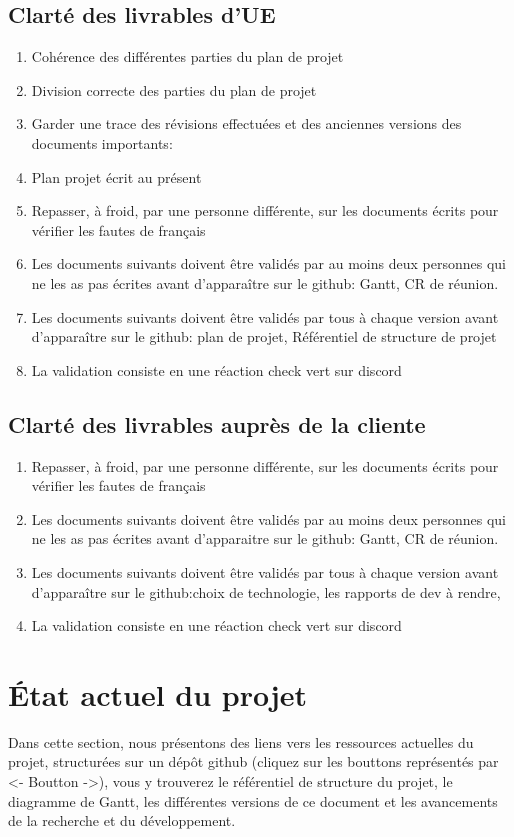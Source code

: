 \documentclass[11pt]{rapport_class}
\begin{document}
\section{Clarté des livrables d'UE}
\begin{enumerate}
    \item Cohérence des différentes parties du plan de projet
    \item Division correcte des parties du plan de projet
    \item Garder une trace des révisions effectuées et des anciennes versions des documents importants: 
    \item Plan projet écrit au présent
    \item Repasser, à froid, par une personne différente, sur les documents écrits pour vérifier les fautes de français
    \item Les documents suivants doivent être validés par au moins deux personnes qui ne les as pas écrites avant d'apparaître sur le github: Gantt, CR de réunion.
    \item Les documents suivants doivent être validés par tous à chaque version avant d'apparaître sur le github: plan de projet, Référentiel de structure de projet
    \item La validation consiste en une réaction check vert sur discord
\end{enumerate}
\section{Clarté des livrables auprès de la cliente}
\begin{enumerate}
    \item Repasser, à froid, par une personne différente, sur les documents écrits pour vérifier les fautes de français
    \item Les documents suivants doivent être validés par au moins deux personnes qui ne les as pas écrites avant d'apparaitre sur le github: Gantt, CR de réunion.
    \item Les documents suivants doivent être validés par tous à chaque version avant d'apparaître sur le github:choix de technologie, les rapports de dev à rendre,
    \item La validation consiste en une réaction check vert sur discord
\end{enumerate}

\chapter{ État actuel du projet}
\qquad Dans cette section, nous présentons des liens vers les ressources actuelles du projet, structurées sur un dépôt github (cliquez sur les bouttons représentés par <- Boutton ->), vous y trouverez le référentiel de structure du projet, le diagramme de Gantt, les différentes versions de ce document et les avancements de la recherche et du développement.
\end{document}

